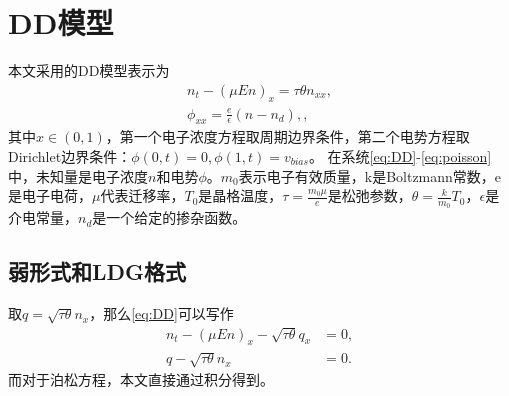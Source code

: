 \section{DD模型}
本文采用的DD模型表示为
\begin{align}
    n_t - (\mu En)_x = \tau \theta n_{xx}, \label{eq:DD} \\
    \phi_{xx} = \frac{e}{\epsilon}(n - n_d),  \label{eq:poisson},
\end{align}
其中$x\in(0,1)$，第一个电子浓度方程取周期边界条件，第二个电势方程取Dirichlet边界条件：$\phi(0,t) = 0, \phi(1,t) = v_{bias}$。
在系统\eqref{eq:DD}-\eqref{eq:poisson}中，未知量是电子浓度$n$和电势$\phi$。$m_0$表示电子有效质量，k是Boltzmann常数，e是电子电荷，$\mu$代表迁移率，$T_0$是晶格温度，$\tau = \frac{m_0 \mu}{e}$是松弛参数，$\theta = \frac{k}{m_0}T_0$，$\epsilon$是介电常量，$n_d$是一个给定的掺杂函数。

\subsection{弱形式和LDG格式}
取$q = \sqrt{\tau \theta }n_x$，那么\autoref{eq:DD}可以写作
\begin{align}
    n_t - (\mu E n)_x - \sqrt{\tau \theta}q_x & = 0, \label{eq:DD:electronConcentration} \\
    q - \sqrt{\tau \theta}n_x                 & = 0. \label{eq:DD:auxiliaryFunction}
\end{align}
而对于泊松方程，本文直接通过积分得到。

